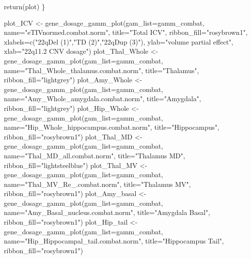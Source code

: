 \documentclass[
]{article}
\newenvironment{Shaded}{\begin{snugshade}}{\end{snugshade}}
\newcommand{\AttributeTok}[1]{\textcolor[rgb]{0.77,0.63,0.00}{#1}}
\newcommand{\FunctionTok}[1]{\textcolor[rgb]{0.00,0.00,0.00}{#1}}
\newcommand{\NormalTok}[1]{#1}
\newcommand{\OtherTok}[1]{\textcolor[rgb]{0.56,0.35,0.01}{#1}}
\newcommand{\StringTok}[1]{\textcolor[rgb]{0.31,0.60,0.02}{#1}}
\begin{document}
\begin{Shaded}
\begin{Highlighting}[]
  \FunctionTok{return}\NormalTok{(plot)}
\NormalTok{\}}

\NormalTok{plot\_ICV }\OtherTok{\textless{}{-}} \FunctionTok{gene\_dosage\_gamm\_plot}\NormalTok{(}\AttributeTok{gam\_list=}\NormalTok{gamm\_combat, }\AttributeTok{name=}\StringTok{"eTIVnormed.combat.norm"}\NormalTok{, }\AttributeTok{title=}\StringTok{"Total ICV"}\NormalTok{, }\AttributeTok{ribbon\_fill=}\StringTok{"rosybrown1"}\NormalTok{, }\AttributeTok{xlabels=}\FunctionTok{c}\NormalTok{(}\StringTok{"22qDel (1)"}\NormalTok{,}\StringTok{"TD (2)"}\NormalTok{,}\StringTok{"22qDup (3)"}\NormalTok{), }\AttributeTok{ylab=}\StringTok{"volume partial effect"}\NormalTok{, }\AttributeTok{xlab=}\StringTok{"22q11.2 CNV dosage"}\NormalTok{)}
\NormalTok{plot\_Thal\_Whole }\OtherTok{\textless{}{-}} \FunctionTok{gene\_dosage\_gamm\_plot}\NormalTok{(}\AttributeTok{gam\_list=}\NormalTok{gamm\_combat, }\AttributeTok{name=}\StringTok{"Thal\_Whole\_thalamus.combat.norm"}\NormalTok{, }\AttributeTok{title=}\StringTok{"Thalamus"}\NormalTok{, }\AttributeTok{ribbon\_fill=}\StringTok{"lightgrey"}\NormalTok{)}
\NormalTok{plot\_Amy\_Whole }\OtherTok{\textless{}{-}} \FunctionTok{gene\_dosage\_gamm\_plot}\NormalTok{(}\AttributeTok{gam\_list=}\NormalTok{gamm\_combat, }\AttributeTok{name=}\StringTok{"Amy\_Whole\_amygdala.combat.norm"}\NormalTok{, }\AttributeTok{title=}\StringTok{"Amygdala"}\NormalTok{, }\AttributeTok{ribbon\_fill=}\StringTok{"lightgrey"}\NormalTok{)}
\NormalTok{plot\_Hip\_Whole }\OtherTok{\textless{}{-}} \FunctionTok{gene\_dosage\_gamm\_plot}\NormalTok{(}\AttributeTok{gam\_list=}\NormalTok{gamm\_combat, }\AttributeTok{name=}\StringTok{"Hip\_Whole\_hippocampus.combat.norm"}\NormalTok{, }\AttributeTok{title=}\StringTok{"Hippocampus"}\NormalTok{, }\AttributeTok{ribbon\_fill=}\StringTok{"rosybrown1"}\NormalTok{)}
\NormalTok{plot\_Thal\_MD }\OtherTok{\textless{}{-}} \FunctionTok{gene\_dosage\_gamm\_plot}\NormalTok{(}\AttributeTok{gam\_list=}\NormalTok{gamm\_combat, }\AttributeTok{name=}\StringTok{"Thal\_MD\_all.combat.norm"}\NormalTok{, }\AttributeTok{title=}\StringTok{"Thalamus MD"}\NormalTok{, }\AttributeTok{ribbon\_fill=}\StringTok{"lightsteelblue"}\NormalTok{)}
\NormalTok{plot\_Thal\_MV }\OtherTok{\textless{}{-}} \FunctionTok{gene\_dosage\_gamm\_plot}\NormalTok{(}\AttributeTok{gam\_list=}\NormalTok{gamm\_combat, }\AttributeTok{name=}\StringTok{"Thal\_MV\_Re\_.combat.norm"}\NormalTok{, }\AttributeTok{title=}\StringTok{"Thalamus MV"}\NormalTok{, }\AttributeTok{ribbon\_fill=}\StringTok{"rosybrown1"}\NormalTok{)}
\NormalTok{plot\_Amy\_basal }\OtherTok{\textless{}{-}} \FunctionTok{gene\_dosage\_gamm\_plot}\NormalTok{(}\AttributeTok{gam\_list=}\NormalTok{gamm\_combat, }\AttributeTok{name=}\StringTok{"Amy\_Basal\_nucleus.combat.norm"}\NormalTok{, }\AttributeTok{title=}\StringTok{"Amygdala Basal"}\NormalTok{, }\AttributeTok{ribbon\_fill=}\StringTok{"rosybrown1"}\NormalTok{)}
\NormalTok{plot\_Hip\_tail }\OtherTok{\textless{}{-}} \FunctionTok{gene\_dosage\_gamm\_plot}\NormalTok{(}\AttributeTok{gam\_list=}\NormalTok{gamm\_combat, }\AttributeTok{name=}\StringTok{"Hip\_Hippocampal\_tail.combat.norm"}\NormalTok{, }\AttributeTok{title=}\StringTok{"Hippocampus Tail"}\NormalTok{, }\AttributeTok{ribbon\_fill=}\StringTok{"rosybrown1"}\NormalTok{)}


\end{Highlighting}
\end{Shaded}
\end{document}
